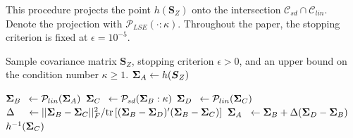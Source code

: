 \documentclass[11pt]{article}
\newcommand{\bLambda}{\boldsymbol{\lambda}}
\theoremstyle{definition}
\theoremstyle{definition}
\def\bSigma{{\bf \Sigma}}
\def\bLambda{{\bf \Lambda}}
\def\Tr{\text{tr}}
\begin{document}
\begin{algorithm}[t]
\caption{This procedure projects the point $h(\boldsymbol{S}_Z)$ onto the intersection $\mathcal{C}_{sd} \cap \mathcal{C}_{lin}$. Denote the projection with $\mathcal{P}_{LSE}(\cdot : \kappa)$. Throughout the paper, the stopping criterion is fixed at $\epsilon = 10^{-5}$.}
\label{proj_algo}
\begin{algorithmic}[1]
\Require Sample covariance matrix $\boldsymbol{S}_Z$, stopping criterion $\epsilon > 0$, and an upper bound on the condition number $\kappa \geq 1$. 
\State $\bSigma_{A} \leftarrow  h(\boldsymbol{S}_Z)$
\Repeat

\State $\bSigma_{B} \hspace{0.5em} \leftarrow \mathcal{P}_{lin}(\bSigma_{A})$
\State $\bSigma_{C} \hspace{0.5em} \leftarrow \mathcal{P}_{sd}(\bSigma_{B}: \kappa)$
\State $\bSigma_{D} \hspace{0.5em} \leftarrow \mathcal{P}_{lin}(\bSigma_{C})$
\State $\Delta \hspace{1.2em}\leftarrow ||\bSigma_{B} - \bSigma_{C}||_F^2 / \Tr\left[(\bSigma_{B}-\bSigma_{D})' (\bSigma_{B}-\bSigma_{C} )\right]$
\State $\bSigma_{A} \hspace{0.6em} \leftarrow \bSigma_{B} + \Delta(\bSigma_{D}-\bSigma_{B})$
\Until{$\max \left\{\left(\bSigma_{D}-\bSigma_{C}\right)_{ij}^2\right\} < \epsilon$}
\State
\Return $h^{-1}(\bSigma_{C})$
\EndProcedure
\end{algorithmic}
\label{algo}
\end{algorithm}
\end{document}
